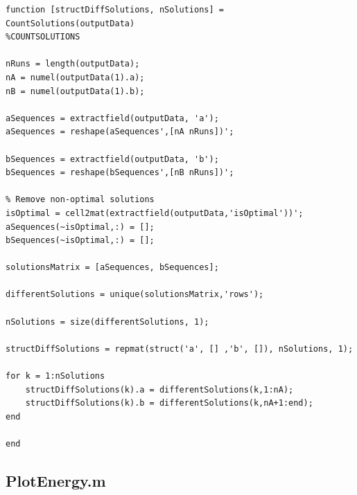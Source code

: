 \documentclass[12pt,A4,titlepage]{article}
\begin{document}
\begin{lstlisting}
function [structDiffSolutions, nSolutions] = CountSolutions(outputData)
%COUNTSOLUTIONS

nRuns = length(outputData);
nA = numel(outputData(1).a);
nB = numel(outputData(1).b);

aSequences = extractfield(outputData, 'a');
aSequences = reshape(aSequences',[nA nRuns])';

bSequences = extractfield(outputData, 'b');
bSequences = reshape(bSequences',[nB nRuns])';

% Remove non-optimal solutions
isOptimal = cell2mat(extractfield(outputData,'isOptimal'))';
aSequences(~isOptimal,:) = [];
bSequences(~isOptimal,:) = [];

solutionsMatrix = [aSequences, bSequences];

differentSolutions = unique(solutionsMatrix,'rows');

nSolutions = size(differentSolutions, 1);

structDiffSolutions = repmat(struct('a', [] ,'b', []), nSolutions, 1);
    
for k = 1:nSolutions
    structDiffSolutions(k).a = differentSolutions(k,1:nA);
    structDiffSolutions(k).b = differentSolutions(k,nA+1:end);
end

end
\end{lstlisting}


\subsection*{PlotEnergy.m}
\end{document}
